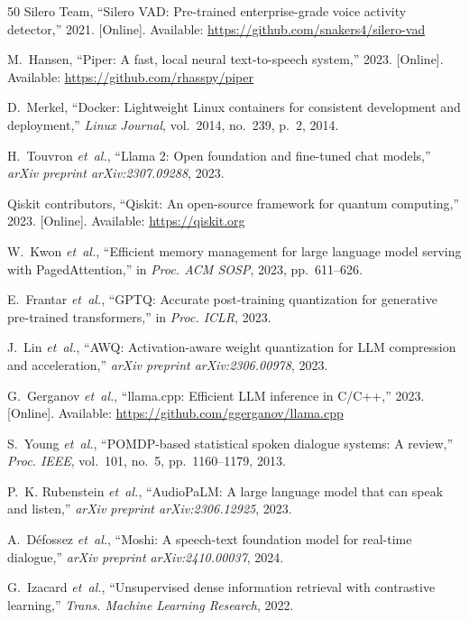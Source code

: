 \documentclass[11pt,a4paper]{article}
\begin{document}
\begin{thebibliography}{50}
Silero Team, ``Silero VAD: Pre-trained enterprise-grade voice activity detector,'' 2021. [Online]. Available: \url{https://github.com/snakers4/silero-vad}

M.~Hansen, ``Piper: A fast, local neural text-to-speech system,'' 2023. [Online]. Available: \url{https://github.com/rhasspy/piper}

D.~Merkel, ``Docker: Lightweight Linux containers for consistent development and deployment,'' \emph{Linux Journal}, vol.~2014, no.~239, p.~2, 2014.

H.~Touvron \emph{et~al.}, ``Llama 2: Open foundation and fine-tuned chat models,'' \emph{arXiv preprint arXiv:2307.09288}, 2023.

Qiskit contributors, ``Qiskit: An open-source framework for quantum computing,'' 2023. [Online]. Available: \url{https://qiskit.org}

W.~Kwon \emph{et~al.}, ``Efficient memory management for large language model serving with PagedAttention,'' in \emph{Proc. ACM SOSP}, 2023, pp.~611--626.

E.~Frantar \emph{et~al.}, ``GPTQ: Accurate post-training quantization for generative pre-trained transformers,'' in \emph{Proc. ICLR}, 2023.

J.~Lin \emph{et~al.}, ``AWQ: Activation-aware weight quantization for LLM compression and acceleration,'' \emph{arXiv preprint arXiv:2306.00978}, 2023.

G.~Gerganov \emph{et~al.}, ``llama.cpp: Efficient LLM inference in C/C++,'' 2023. [Online]. Available: \url{https://github.com/ggerganov/llama.cpp}

S.~Young \emph{et~al.}, ``POMDP-based statistical spoken dialogue systems: A review,'' \emph{Proc. IEEE}, vol.~101, no.~5, pp.~1160--1179, 2013.

P.~K. Rubenstein \emph{et~al.}, ``AudioPaLM: A large language model that can speak and listen,'' \emph{arXiv preprint arXiv:2306.12925}, 2023.

A.~D{\'e}fossez \emph{et~al.}, ``Moshi: A speech-text foundation model for real-time dialogue,'' \emph{arXiv preprint arXiv:2410.00037}, 2024.

G.~Izacard \emph{et~al.}, ``Unsupervised dense information retrieval with contrastive learning,'' \emph{Trans. Machine Learning Research}, 2022.


\end{thebibliography}
\end{document}
